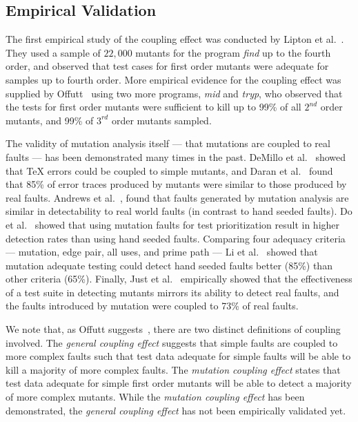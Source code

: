 \documentclass[preprint,nonatbib]{sigplanconf}\usepackage[]{graphicx}\usepackage[]{color}
\begin{document}
\subsection{Empirical Validation}

The first empirical study of the coupling effect was conducted by Lipton et al.~\cite{lipton1978the,demillo1978hints}.
They used a sample of $22,000$ mutants for the program \emph{find} up to the fourth order, and
observed that test cases for first order mutants were adequate for samples up
to fourth order.  More empirical evidence for the coupling effect was supplied by
Offutt~\cite{offutt1992investigations,offutt1989thecoupling} using two more
programs, \emph{mid} and \emph{tryp}, who observed that the tests for first
order mutants were sufficient to kill up to 99\% of all $2^{nd}$ order mutants, and
99\% of $3^{rd}$ order mutants sampled.

The validity of mutation analysis itself --- that mutations are coupled to
real faults --- has been demonstrated many times in the past.
DeMillo et al.~\cite{demillo1991on} showed that \TeX{} errors could be coupled to
simple mutants, and Daran et al.~\cite{daran1996software} found that 85\% of
error traces produced by mutants were similar to those produced by real faults.
Andrews et al.~\cite{andrews2005mutation,andrews2006using},
found that faults generated by mutation analysis are similar in detectability
to real world faults (in contrast to hand seeded
faults). Do et al.~\cite{do2006on} showed that using mutation faults for test
prioritization result in higher detection rates than using hand seeded faults.
Comparing four adequacy
criteria --- mutation, edge pair, all uses, and prime path ---
Li et al.~\cite{li2009experimental} showed that
mutation adequate testing could detect hand seeded faults better (85\%)
than other criteria (65\%).
Finally, Just et al.~\cite{just2014mutants} empirically showed that the
effectiveness of a test suite in detecting mutants mirrors its ability to
detect real faults, and the faults introduced by mutation were coupled to 73\%
of real faults.

We note that, as Offutt suggests~\cite{offutt1992investigations,offutt1989thecoupling},
there are two distinct definitions of coupling involved. The
\emph{general coupling effect} suggests that simple faults are coupled to more
complex faults such that test data adequate for simple faults will be able to
kill a majority of more complex faults. The \emph{mutation coupling effect}
states that test data adequate for simple first order mutants will be able to
detect a majority of more complex mutants. While the \emph{mutation
coupling effect} has been demonstrated, the \emph{general coupling
effect} has not been empirically validated yet.
\end{document}
